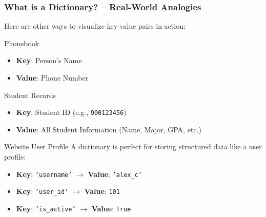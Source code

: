 \documentclass{beamer}
\begin{document}
\begin{frame}[fragile]
    \frametitle{What is a Dictionary? -- Real-World Analogies}
    Here are other ways to visualize key-value pairs in action:

    \begin{block}{Phonebook}
        \begin{itemize}
            \item \textbf{Key}: Person's Name
            \item \textbf{Value}: Phone Number
        \end{itemize}
    \end{block}

    \begin{block}{Student Records}
        \begin{itemize}
            \item \textbf{Key}: Student ID (e.g., \texttt{900123456})
            \item \textbf{Value}: All Student Information (Name, Major, GPA, etc.)
        \end{itemize}
    \end{block}

    \begin{block}{Website User Profile}
        A dictionary is perfect for storing structured data like a user profile:
        \begin{itemize}
            \item \textbf{Key}: \texttt{'username'} $\rightarrow$ \textbf{Value}: \texttt{'alex\_c'}
            \item \textbf{Key}: \texttt{'user\_id'} $\rightarrow$ \textbf{Value}: \texttt{101}
            \item \textbf{Key}: \texttt{'is\_active'} $\rightarrow$ \textbf{Value}: \texttt{True}
        \end{itemize}
    \end{block}
\end{frame}
\end{document}
